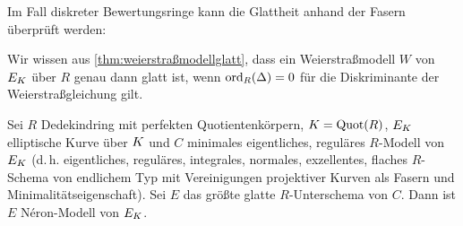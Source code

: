 \documentclass[german]{scrreprt}
\begin{document}
Im Fall diskreter Bewertungsringe kann die Glattheit anhand der Fasern
überprüft werden:
\begin{Bemerkung}
  Wir wissen aus \autoref{thm:weierstraßmodellglatt},
  dass ein Weierstraßmodell $W$ von $E_{K}$ über $R$ genau dann glatt
  ist, wenn $\operatorname{ord}_R(\Delta)=0$ für die Diskriminante der
  Weierstraßgleichung gilt.
\end{Bemerkung}

\begin{Satz}\label{thm:exneronmodelle}

  Sei $R$ Dedekindring mit perfekten Quotientenkörpern,
  $K=\operatorname{Quot}(R)$, $E_{K}$ elliptische Kurve über $K$ und $C$ minimales
  eigentliches, reguläres $R$-Modell von $E_{K}$
  (d.\,h. eigentliches, reguläres, integrales, normales, exzellentes,
  flaches $R$-Schema von endlichem Typ mit Vereinigungen projektiver
  Kurven als Fasern und Minimalitätseigenschaft).
  Sei $E$ das größte glatte $R$-Unterschema von $C$.
  Dann ist $E$ Néron-Modell von $E_{K}$.


\end{Satz}
\end{document}
